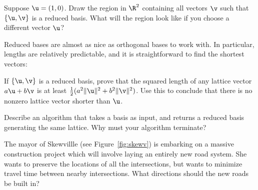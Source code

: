 \begin{explor}\label{exp:drawregion}
	Suppose $\u=(1,0)$. Draw the region in $\R^2$ containing all vectors $\v$ such that $\{\u,\v\}$ is a reduced basis. What will the region look like if you choose a different vector $\u$?
\end{explor}

Reduced bases are almost as nice as orthogonal bases to work with. In particular, lengths are relatively predictable, and it is straightforward to find the shortest vectors:

\begin{explor}
	If $\{\u,\v\}$ is a reduced basis, prove that the squared length of any lattice vector $a\u+b\v$ is at least $\frac12(a^2\|\u\|^2+b^2\|\v\|^2)$. Use this to conclude that there is no nonzero lattice vector shorter than $\u$.
\end{explor}
\begin{explor}
	Describe an algorithm that takes a basis as input, and returns a reduced basis generating the same lattice. Why must your algorithm terminate?
\end{explor}

\begin{explor}
	The mayor of Skewvillle (see Figure~\ref{fig:skewv}) is embarking on a massive construction project which will involve laying an entirely new road system. She wants to preserve the locations of all the intersections, but wants to minimize travel time between nearby intersections. What directions should the new roads be built in?
\end{explor}

